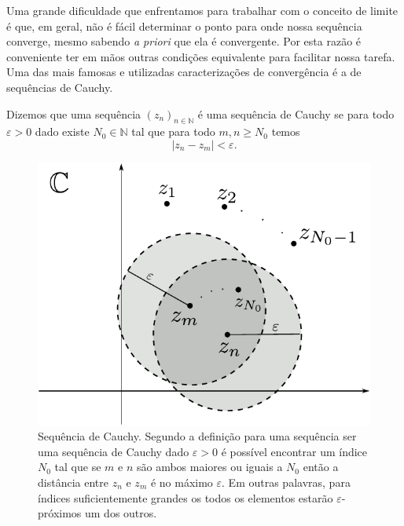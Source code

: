 
Uma grande dificuldade que enfrentamos para trabalhar com o conceito de limite é que, em geral,
não é fácil determinar o ponto para onde nossa sequência converge, mesmo sabendo \textit{a priori} que ela é 
convergente. Por esta razão é conveniente ter em mãos outras condições equivalente para facilitar nossa
tarefa. Uma das mais famosas e utilizadas caracterizações de convergência é a 
de sequências de Cauchy. 

\begin{definicao}\label{def-seq-Cauchy}
Dizemos que uma sequência $(z_n)_{n\in\mathbb{N}}$ é uma sequência de Cauchy se 
para todo $\varepsilon>0$ dado existe $N_0\in\mathbb{N}$ tal que para todo $m,n\geqslant N_0$
temos 
\[
|z_n-z_m|<\varepsilon.
\]
\end{definicao}
\begin{figure}[h]
\centering
\includegraphics[scale=0.6]{Figuras/fig-sequencia-Cauchy-2}
\caption{Sequência de Cauchy. Segundo a definição para uma sequência ser uma sequência de Cauchy dado $\varepsilon>0$
é possível encontrar um índice $N_0$ tal que se $m$ e $n$ são ambos maiores ou iguais a $N_0$ então 
a distância entre $z_n$ e $z_m$ é no máximo $\varepsilon$. Em outras palavras, para índices suficientemente
grandes os todos os elementos estarão $\varepsilon$-próximos um dos outros.}
\label{fig:fig-sequencia-cauchy}
\end{figure}


